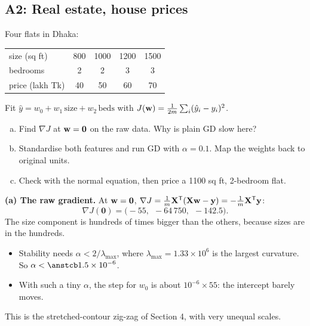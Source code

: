 \subsection{A2: Real estate, house prices}

\begin{frame}{}
  \begin{probbox}
    Four flats in Dhaka:
    \begin{center}\small
    \begin{tabular}{@{}l c c c c@{}}
      size (sq ft) & 800 & 1000 & 1200 & 1500 \\
      bedrooms & 2 & 2 & 3 & 3 \\
      price (lakh Tk) & 40 & 50 & 60 & 70 \\
    \end{tabular}
    \end{center}
    Fit $\hat y = w_0 + w_1\,\text{size} + w_2\,\text{beds}$ with $J(\mathbf{w}) = \frac{1}{2m}\sum_i(\hat y_i - y_i)^2$.
    \begin{enumerate}[(a)]
      \item Find $\nabla J$ at $\mathbf{w} = \mathbf 0$ on the raw data. Why is plain GD slow here?
      \item Standardise both features and run GD with $\alpha = 0.1$. Map the weights back to original units.
      \item Check with the normal equation, then price a 1100 sq ft, 2-bedroom flat.
    \end{enumerate}
  \end{probbox}
\end{frame}

\begin{frame}{}
  \textbf{(a) The raw gradient.} At $\mathbf{w} = \mathbf 0$, $\nabla J = \tfrac1m\mathbf{X}^{\mathsf T}(\mathbf{X}\mathbf{w} - \mathbf{y}) = -\tfrac1m\mathbf{X}^{\mathsf T}\mathbf{y}$:
  \[
    \nabla J(\mathbf 0) = \bigl(-55,\ \ -64\,750,\ \ -142.5\bigr).
  \]
  The size component is hundreds of times bigger than the others, because sizes are in the hundreds.
  \begin{itemize}\small
    \item Stability needs $\alpha < 2/\lambda_{\max}$, where $\lambda_{\max} = 1.33\times10^{6}$ is the largest curvature.
          So $\alpha < \ans{1.5\times10^{-6}}$.
    \item With such a tiny $\alpha$, the step for $w_0$ is about $10^{-6}\times55$: the intercept barely moves.
  \end{itemize}
  This is the stretched-contour zig-zag of Section 4, with very unequal scales.
\end{frame}


